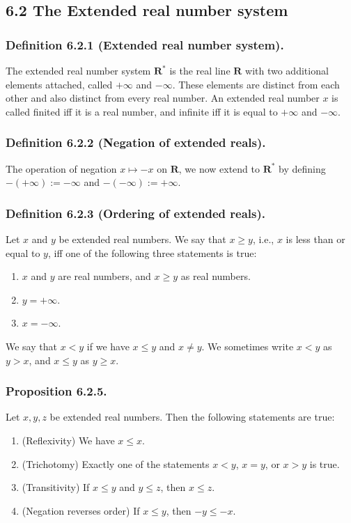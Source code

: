 \documentclass[12pt, letter]{article}
\begin{document}
\subsection*{6.2 The Extended real number system}
\subsubsection*{Definition 6.2.1 (Extended real number system).}
The extended real number system $\mathbf{R^*}$ is the real line $\mathbf{R}$ with two additional elements attached, called $+\infty$ and $-\infty$. These elements are distinct from each 
other and also distinct from every real number. An extended real number $x$ is called finited iff it is a real number, and infinite iff it is equal to $+\infty$ and $-\infty$.
\subsubsection*{Definition 6.2.2 (Negation of extended reals).}
The operation of negation $x\mapsto -x$ on $\mathbf{R}$, we now extend to $\mathbf{R^*}$ by defining $-(+\infty):=-\infty$ and $-(-\infty):=+\infty$.
\subsubsection*{Definition 6.2.3 (Ordering of extended reals).}
Let $x$ and $y$ be extended real numbers. We say that $x\geq y$, i.e., $x$ is less than or equal to $y$, iff one of the following three statements is true:
\begin{enumerate}[label=(\alph*)]
    \item $x$ and $y$ are real numbers, and $x\geq y$ as real numbers.
    \item $y=+\infty$.
    \item $x=-\infty$.
\end{enumerate}
We say that $x<y$ if we have $x\leq y$ and $x\ne y$. We sometimes write $x<y$ as $y>x$, and $x\leq y$ as $y\geq x$. 
\subsubsection*{Proposition 6.2.5.}
Let $x,y,z$ be extended real numbers. Then the following statements are true:
\begin{enumerate}[label=(\alph*)]
    \item (Reflexivity) We have $x\leq x$.
    \item (Trichotomy) Exactly one of the statements $x<y$, $x=y$, or $x>y$ is true.
    \item (Transitivity) If $x\leq y$ and $y\leq z$, then $x\leq z$.
    \item (Negation reverses order) If $x\leq y$, then $-y\leq -x$.
\end{enumerate}
\end{document}
